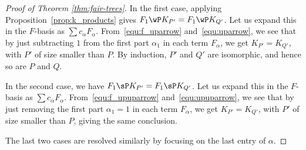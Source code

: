 \begin{proof}[Proof of Theorem \ref{thm:fair-trees}]
In the first case, applying Proposition~\ref{prop:k_products} gives $F_1\wP K_{P'} = F_1\wP K_{Q'}$.  Let us expand this in the $F$-basis as $\sum c_\alpha F_\alpha$.  From~\eqref{equ:f_uparrow} and~\eqref{equ:uparrow}, we see that by just subtracting $1$ from the first part $\alpha_1$ in each term $F_\alpha$, we get $K_{P'} = K_{Q'}$, with $P'$ of size smaller than $P$.
By induction, $P'$ and $Q'$ are isomorphic, and hence so are $P$ and $Q$.

In the second case, we have  $F_1\sP K_{P'} = F_1\sP K_{Q'}$.
Let us expand this in the $F$-basis as $\sum c_\alpha F_\alpha$.
From~\eqref{equ:f_upuparrow} and~\eqref{equ:upuparrow}, we see that by just  removing the first part $\alpha_1=1$ 
in each term $F_\alpha$, we get $K_{P'} = K_{Q'}$, with $P'$ of size smaller than $P$, giving the same conclusion.

The last two cases are resolved similarly by focusing on the last entry of $\alpha$.
\end{proof}
